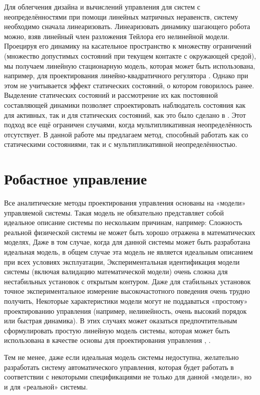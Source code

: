 Для облегчения дизайна и вычислений управления для систем с неопределённостями при помощи линейных матричных неравенств, систему необходимо сначала линеаризовать. Линеаризовать динамику шагающего робота можно, взяв линейный член разложения Тейлора его нелинейной модели. Проецируя его динамику на касательное пространство к множеству ограничений (множество допустимых состояний при текущем контакте с окружающей средой), мы получаем линейную стационарную модель, которая может быть использована, например, для проектирования линейно-квадратичного регулятора \cite{mason2014full}. Однако при этом не учитывается эффект статических состояний, о котором говорилось ранее. Выделение статических состояний и рассмотрение их как постоянной составляющей динамики позволяет спроектировать наблюдатель состояния как для активных, так и для статических состояний, как это было сделано в \cite{SAVIN2021}. Этот подход все ещё ограничен случаями, когда мультипликативная неопределённость отсутствует. В данной работе мы предлагаем метод, способный работать как со статическими состояниями, так и с мультипликативной неопределённостью.

\section{Робастное управление}\label{sec:ch1/sec4}
Все аналитические методы проектирования управления основаны на «модели» управляемой системы. Такая модель не обязательно представляет собой идеальное описание системы по нескольким причинам, например: Сложность реальной физической системы не может быть хорошо отражена в математических моделях, Даже в том случае, когда для данной системы может быть разработана идеальная модель, в общем случае эта модель не является идеальным описанием при всех условиях эксплуатации, Экспериментальная идентификация модели системы (включая валидацию математической модели) очень сложна для нестабильных установок с открытым контуром. Даже для стабильных установок точное экспериментальное измерение высокочастотного поведения очень трудно получить, Некоторые характеристики модели могут не поддаваться «простому» проектированию управления (например, нелинейность, очень высокий порядок или быстрая динамика). В этих случаях может оказаться предпочтительным сформулировать простую линейную модель системы, которая может быть использована в качестве основы для проектирования управления \cite{barmish1994new}, \cite{Garulli2000}.

Тем не менее, даже если идеальная модель системы недоступна, желательно разработать систему автоматического управления, которая будет работать в соответствии с некоторыми спецификациями не только для данной «модели», но и для «реальной» системы.

